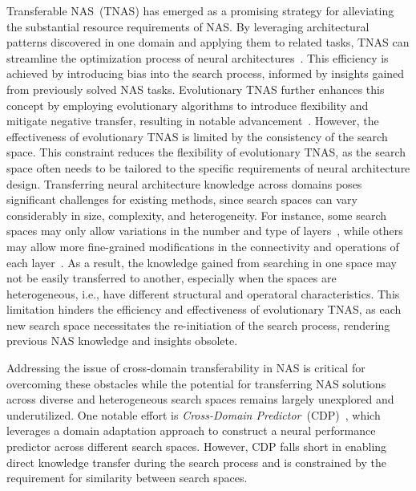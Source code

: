 \documentclass[../main.tex]{subfiles}
\begin{document}
Transferable NAS~(TNAS) has emerged as a promising strategy for alleviating the substantial resource requirements of NAS\@.
By leveraging architectural patterns discovered in one domain and applying them to related tasks, TNAS can streamline the optimization process of neural architectures~\cite{DBLP:journals/pami/LuSGBDB21}.
This efficiency is achieved by introducing bias into the search process, informed by insights gained from previously solved NAS tasks.
Evolutionary TNAS further enhances this concept by employing evolutionary algorithms to introduce flexibility and mitigate negative transfer, resulting in notable advancement~\cite{DBLP:conf/cvpr/LiaoJD23,DBLP:journals/tec/ZhouWFLWT24}.
However, the effectiveness of evolutionary TNAS is limited by the consistency of the search space.
This constraint reduces the flexibility of evolutionary TNAS, as the search space often needs to be tailored to the specific requirements of neural architecture design.
Transferring neural architecture knowledge across domains poses significant challenges for existing methods, since search spaces can vary considerably in size, complexity, and heterogeneity.
For instance, some search spaces may only allow variations in the number and type of layers~\cite{DBLP:journals/tnn/SunXZY20}, while others may allow more fine-grained modifications in the connectivity and operations of each layer~\cite{DBLP:conf/cvpr/ZophVSL18,DBLP:conf/iclr/LiuSY19,DBLP:journals/tnn/DongHFTTO23}.
As a result, the knowledge gained from searching in one space may not be easily transferred to another, especially when the spaces are heterogeneous, i.e., have different structural and operatoral characteristics.
This limitation hinders the efficiency and effectiveness of evolutionary TNAS, as each new search space necessitates the re-initiation of the search process, rendering previous NAS knowledge and insights obsolete.

Addressing the issue of cross-domain transferability in NAS is critical for overcoming these obstacles while the potential for transferring NAS solutions across diverse and heterogeneous search spaces remains largely unexplored and underutilized.
One notable effort is \textit{Cross-Domain Predictor}~(CDP)~\cite{DBLP:conf/nips/0002TLW022}, which leverages a domain adaptation approach to construct a neural performance predictor across different search spaces. However, CDP falls short in enabling direct knowledge transfer during the search process and is constrained by the requirement for similarity between search spaces.
\end{document}
